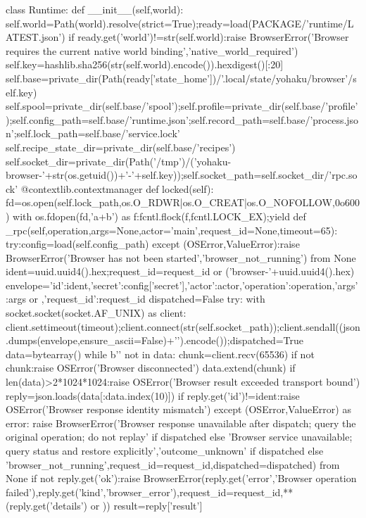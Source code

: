class Runtime:
 def __init__(self,world):
  self.world=Path(world).resolve(strict=True);ready=load(PACKAGE/'runtime/LATEST.json')
  if ready.get('world')!=str(self.world):raise BrowserError('Browser requires the current native world binding','native_world_required')
  self.key=hashlib.sha256(str(self.world).encode()).hexdigest()[:20]
  self.base=private_dir(Path(ready['state_home'])/'.local/state/yohaku/browser'/self.key)
  self.spool=private_dir(self.base/'spool');self.profile=private_dir(self.base/'profile');self.config_path=self.base/'runtime.json';self.record_path=self.base/'process.json';self.lock_path=self.base/'service.lock'
  self.recipe_state_dir=private_dir(self.base/'recipes')
  self.socket_dir=private_dir(Path('/tmp')/('yohaku-browser-'+str(os.getuid())+'-'+self.key));self.socket_path=self.socket_dir/'rpc.sock'
 @contextlib.contextmanager
 def locked(self):
  fd=os.open(self.lock_path,os.O_RDWR|os.O_CREAT|os.O_NOFOLLOW,0o600)
  with os.fdopen(fd,'a+b') as f:fcntl.flock(f,fcntl.LOCK_EX);yield
 def _rpc(self,operation,args=None,actor='main',request_id=None,timeout=65):
  try:config=load(self.config_path)
  except (OSError,ValueError):raise BrowserError('Browser has not been started','browser_not_running') from None
  ident=uuid.uuid4().hex;request_id=request_id or ('browser-'+uuid.uuid4().hex)
  envelope={'id':ident,'secret':config['secret'],'actor':actor,'operation':operation,'args':args or {},'request_id':request_id}
  dispatched=False
  try:
   with socket.socket(socket.AF_UNIX) as client:
    client.settimeout(timeout);client.connect(str(self.socket_path));client.sendall((json.dumps(envelope,ensure_ascii=False)+'\n').encode());dispatched=True
    data=bytearray()
    while b'\n' not in data:
     chunk=client.recv(65536)
     if not chunk:raise OSError('Browser disconnected')
     data.extend(chunk)
     if len(data)>2*1024*1024:raise OSError('Browser result exceeded transport bound')
    reply=json.loads(data[:data.index(10)])
   if reply.get('id')!=ident:raise OSError('Browser response identity mismatch')
  except (OSError,ValueError) as error:
   raise BrowserError('Browser response unavailable after dispatch; query the original operation; do not replay' if dispatched else 'Browser service unavailable; query status and restore explicitly','outcome_unknown' if dispatched else 'browser_not_running',request_id=request_id,dispatched=dispatched) from None
  if not reply.get('ok'):raise BrowserError(reply.get('error','Browser operation failed'),reply.get('kind','browser_error'),request_id=request_id,**(reply.get('details') or {}))
  result=reply['result']
